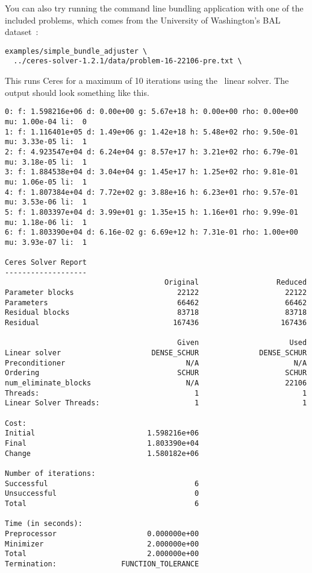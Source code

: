 You can also try running the command line bundling application with one of the
included problems, which comes from the University of Washington's BAL dataset~\cite{Agarwal10bal}:
\begin{verbatim}
examples/simple_bundle_adjuster \
  ../ceres-solver-1.2.1/data/problem-16-22106-pre.txt \
\end{verbatim}
This runs Ceres for a maximum of 10 iterations using the  \denseschur\ linear solver. The output should look something like this.
\clearpage
\begin{verbatim}
0: f: 1.598216e+06 d: 0.00e+00 g: 5.67e+18 h: 0.00e+00 rho: 0.00e+00 mu: 1.00e-04 li:  0
1: f: 1.116401e+05 d: 1.49e+06 g: 1.42e+18 h: 5.48e+02 rho: 9.50e-01 mu: 3.33e-05 li:  1
2: f: 4.923547e+04 d: 6.24e+04 g: 8.57e+17 h: 3.21e+02 rho: 6.79e-01 mu: 3.18e-05 li:  1
3: f: 1.884538e+04 d: 3.04e+04 g: 1.45e+17 h: 1.25e+02 rho: 9.81e-01 mu: 1.06e-05 li:  1
4: f: 1.807384e+04 d: 7.72e+02 g: 3.88e+16 h: 6.23e+01 rho: 9.57e-01 mu: 3.53e-06 li:  1
5: f: 1.803397e+04 d: 3.99e+01 g: 1.35e+15 h: 1.16e+01 rho: 9.99e-01 mu: 1.18e-06 li:  1
6: f: 1.803390e+04 d: 6.16e-02 g: 6.69e+12 h: 7.31e-01 rho: 1.00e+00 mu: 3.93e-07 li:  1

Ceres Solver Report
-------------------
                                     Original                  Reduced
Parameter blocks                        22122                    22122
Parameters                              66462                    66462
Residual blocks                         83718                    83718
Residual                               167436                   167436

                                        Given                     Used
Linear solver                     DENSE_SCHUR              DENSE_SCHUR
Preconditioner                            N/A                      N/A
Ordering                                SCHUR                    SCHUR
num_eliminate_blocks                      N/A                    22106
Threads:                                    1                        1
Linear Solver Threads:                      1                        1

Cost:
Initial                          1.598216e+06
Final                            1.803390e+04
Change                           1.580182e+06

Number of iterations:
Successful                                  6
Unsuccessful                                0
Total                                       6

Time (in seconds):
Preprocessor                     0.000000e+00
Minimizer                        2.000000e+00
Total                            2.000000e+00
Termination:               FUNCTION_TOLERANCE
\end{verbatim}

